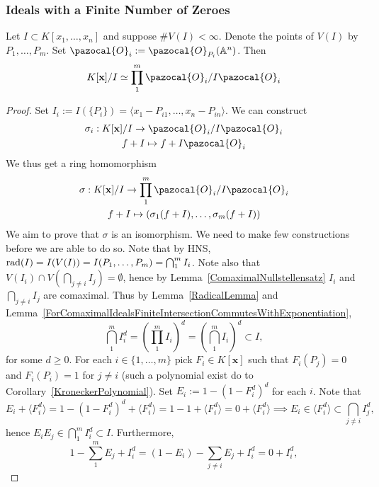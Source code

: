 \subsubsection{Ideals with a Finite Number of Zeroes}
\begin{theorem}\label{IsomorphismTheoremForIdealsWithFinitesNumberOfZeroes}
    Let $I\subset K[x_1,\dots,x_n]$ and suppose $\#V(I)< \infty$. Denote the points of $V(I)$ by $P_1,\dots,P_m$. Set $\pazocal{O}_i:=\pazocal{O}_{P_i}(\A^n)$. Then
    \begin{gather*}
        K[\mathbf{x}]/I\simeq \prod_1^m \pazocal{O}_i/I\pazocal{O}_i
    \end{gather*}
\end{theorem}
\begin{proof}
    Set $I_i:= I(\{P_i\})= \langle x_1-P_{i1},\dots,x_n-P_{in}\rangle$. We can construct 
    \begin{gather*}
        \sigma_i : K[\mathbf{x}]/I\rightarrow  \pazocal{O}_i/I\pazocal{O}_i\\ f + I \mapsto f + I\pazocal{O}_i
    \end{gather*}
    We thus get a ring homomorphism 
    \begin{gather*}
        \sigma : K[\mathbf{x}]/I \rightarrow \prod_1^m \pazocal{O}_i/I\pazocal{O}_i\\ f + I \mapsto (\sigma_1(f+I),\dots,\sigma_m(f+I))    
    \end{gather*}
    We aim to prove that $\sigma$ is an isomorphism. We need to make few constructions before we are able to do so. Note that by HNS, $\mathrm{rad}(I)=I(V(I))=I(P_1,\dots,P_m) = \bigcap_1^m I_i$. Note also that $V(I_i)\cap V(\bigcap_{j\neq i} I_j) =\emptyset$, hence by Lemma~\ref{ComaximalNullstellensatz} $I_i$ and $\bigcap_{j\neq i} I_j$ are comaximal. Thus by Lemma~\ref{RadicalLemma} and Lemma~\ref{ForComaximalIdealsFiniteIntersectionCommutesWithExponentiation},
    $$\bigcap_1^m I_i^d = \left(\prod_1^m I_i\right)^d = \left(\bigcap_1^m I_i\right)^d\subset I,$$
    for some $d\geq 0$. For each $i\in \{1,\dots,m\}$ pick $F_i\in K[\mathbf{x}]$ such that $F_i(P_j)=0$ and $F_i(P_i)=1$ for $j\neq i$ (such a polynomial exist do to Corollary~\ref{KroneckerPolynomial}). Set $E_i := 1-(1-F_i^d)^d$ for each $i$. Note that 
    $$E_i + \langle F_i^d\rangle = 1-(1-F_i^d)^d + \langle F_i^d\rangle = 1-1+\langle F_i^d\rangle=0+\langle F_i^d\rangle\implies E_i\in \langle F_i^d\rangle\subset \bigcap_{j\neq i} I_j^d,$$
    hence $E_iE_j\in \bigcap_1^m I_i^d\subset I.$ Furthermore, 
    $$1-\sum_1^m E_j + I_i^d = (1-E_i)-\sum_{j\neq i} E_j + I_i^d = 0 + I_i^d,$$

\end{proof}
